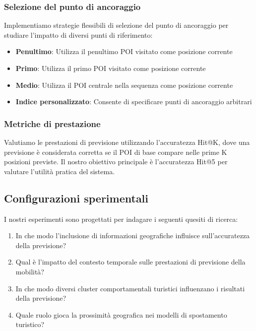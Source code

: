 \documentclass[12pt,a4paper]{article}
\begin{document}
\subsubsection{Selezione del punto di ancoraggio}
Implementiamo strategie flessibili di selezione del punto di ancoraggio per studiare l'impatto di diversi punti di riferimento:
\begin{itemize}
\item \textbf{Penultimo}: Utilizza il penultimo POI visitato come posizione corrente
\item \textbf{Primo}: Utilizza il primo POI visitato come posizione corrente
\item \textbf{Medio}: Utilizza il POI centrale nella sequenza come posizione corrente
\item \textbf{Indice personalizzato}: Consente di specificare punti di ancoraggio arbitrari
\end{itemize}

\subsubsection{Metriche di prestazione}
Valutiamo le prestazioni di previsione utilizzando l'accuratezza Hit@K, dove una previsione è considerata corretta se il POI di base compare nelle prime K posizioni previste. Il nostro obiettivo principale è l'accuratezza Hit@5 per valutare l'utilità pratica del sistema.

\subsection{Configurazioni sperimentali}

I nostri esperimenti sono progettati per indagare i seguenti quesiti di ricerca:

\begin{enumerate}
\item In che modo l'inclusione di informazioni geografiche influisce sull'accuratezza della previsione?
\item Qual è l'impatto del contesto temporale sulle prestazioni di previsione della mobilità?
\item In che modo diversi cluster comportamentali turistici influenzano i risultati della previsione? \item Quale ruolo gioca la prossimità geografica nei modelli di spostamento turistico?
\end{enumerate}


\newpage
\end{document}
